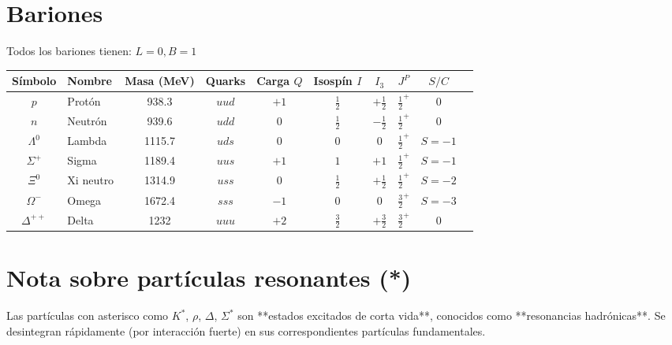 \documentclass{article}
\begin{document}
\vspace{1em}
\section*{Bariones}

Todos los bariones tienen: $ L =  0, B = 1$

\begin{longtable}{|c|l|c|c|c|c|c|c|c|c|}
\hline
Símbolo & Nombre & Masa (MeV) & Quarks & Carga $Q$ & Isospín $I$ & $I_3$ & $J^P$ & $S/C$ \\
\hline
$p$ & Protón & 938.3 & $uud$ & $+1$ & $\frac{1}{2}$ & $+\frac{1}{2}$ & $\frac{1}{2}^+$ & $0$ \\
$n$ & Neutrón & 939.6 & $udd$ & $0$ & $\frac{1}{2}$ & $-\frac{1}{2}$ & $\frac{1}{2}^+$ & $0$ \\
$\Lambda^0$ & Lambda & 1115.7 & $uds$ & $0$ & $0$ & $0$ & $\frac{1}{2}^+$ & $S=-1$ \\
$\Sigma^+$ & Sigma & 1189.4 & $uus$ & $+1$ & $1$ & $+1$ & $\frac{1}{2}^+$ & $S=-1$ \\
$\Xi^0$ & Xi neutro & 1314.9 & $uss$ & $0$ & $\frac{1}{2}$ & $+\frac{1}{2}$ & $\frac{1}{2}^+$ & $S=-2$ \\
$\Omega^-$ & Omega & 1672.4 & $sss$ & $-1$ & $0$ & $0$ & $\frac{3}{2}^+$ & $S=-3$ \\
$\Delta^{++}$ & Delta & 1232 & $uuu$ & $+2$ & $\frac{3}{2}$ & $+\frac{3}{2}$ & $\frac{3}{2}^+$ & $0$ \\
\hline
\end{longtable}

\vspace{1em}
\section*{Nota sobre partículas resonantes (*)}

Las partículas con asterisco como $K^*$, $\rho$, $\Delta$, $\Sigma^*$ son **estados excitados de corta vida**, conocidos como **resonancias hadrónicas**.  
Se desintegran rápidamente (por interacción fuerte) en sus correspondientes partículas fundamentales.
\end{document}
